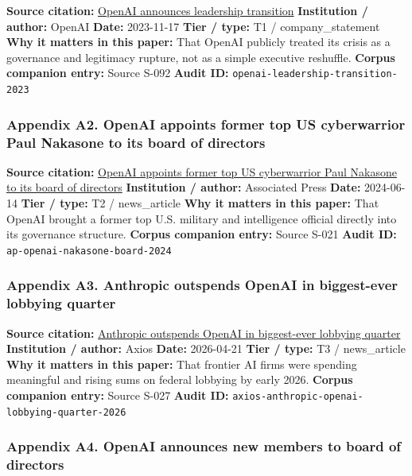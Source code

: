 \documentclass[
  american,
  11pt,
  letterpaper,
]{article}
\begin{document}
\textbf{Source citation:}
\href{https://openai.com/index/openai-announces-leadership-transition/}{OpenAI
announces leadership transition} \textbf{Institution / author:} OpenAI
\textbf{Date:} 2023-11-17 \textbf{Tier / type:} T1 / company\_statement
\textbf{Why it matters in this paper:} That OpenAI publicly treated its
crisis as a governance and legitimacy rupture, not as a simple executive
reshuffle. \textbf{Corpus companion entry:} Source S-092 \textbf{Audit
ID:} \texttt{openai-leadership-transition-2023}

\subsubsection{Appendix A2. OpenAI appoints former top US cyberwarrior
Paul Nakasone to its board of
directors}\label{ch-08-appendix-a2-openai-appoints-former-top-us-cyberwarrior-paul-nakasone-to-its-board-of-directors}

\textbf{Source citation:}
\href{https://apnews.com/article/6ef612a3a0fcaef05480bbd1ebbd79b1}{OpenAI
appoints former top US cyberwarrior Paul Nakasone to its board of
directors} \textbf{Institution / author:} Associated Press
\textbf{Date:} 2024-06-14 \textbf{Tier / type:} T2 / news\_article
\textbf{Why it matters in this paper:} That OpenAI brought a former top
U.S. military and intelligence official directly into its governance
structure. \textbf{Corpus companion entry:} Source S-021 \textbf{Audit
ID:} \texttt{ap-openai-nakasone-board-2024}

\subsubsection{Appendix A3. Anthropic outspends OpenAI in biggest-ever
lobbying
quarter}\label{ch-08-appendix-a3-anthropic-outspends-openai-in-biggest-ever-lobbying-quarter}

\textbf{Source citation:}
\href{https://www.axios.com/2026/04/21/anthropic-outspends-openai-biggest-lobbying-quarter}{Anthropic
outspends OpenAI in biggest-ever lobbying quarter} \textbf{Institution /
author:} Axios \textbf{Date:} 2026-04-21 \textbf{Tier / type:} T3 /
news\_article \textbf{Why it matters in this paper:} That frontier AI
firms were spending meaningful and rising sums on federal lobbying by
early 2026. \textbf{Corpus companion entry:} Source S-027 \textbf{Audit
ID:} \texttt{axios-anthropic-openai-lobbying-quarter-2026}

\subsubsection{Appendix A4. OpenAI announces new members to board of
directors}\label{ch-08-appendix-a4-openai-announces-new-members-to-board-of-directors}
\end{document}
